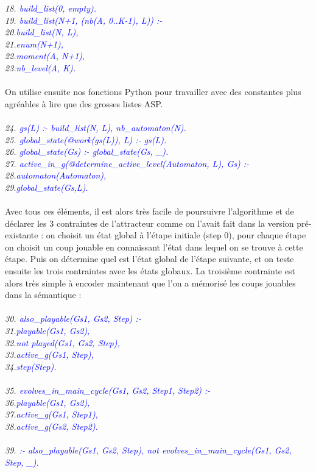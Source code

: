 \documentclass[10pt,a4paper]{article}
\begin{document}
\emph{
	18. \textcolor{blue}{build\_list(0, empty).}\\
	19. \textcolor{blue}{build\_list(N+1, (nb(A, 0..K-1), L)) :-}\\ 
	20.\qquad\textcolor{blue}{build\_list(N, L),}\\
	21.\qquad\textcolor{blue}{enum(N+1),}\\
	22.\qquad\textcolor{blue}{moment(A, N+1),}\\
	23.\qquad\textcolor{blue}{nb\_level(A, K).}\\ \\
}
On utilise ensuite nos fonctions Python pour travailler avec des constantes plus agréables à lire que des grosses listes ASP.\\ \\
\emph{
	24. \textcolor{blue}{gs(L) :- build\_list(N, L), nb\_automaton(N).}\\
	25. \textcolor{blue}{global\_state(@work(gs(L)), L) :- gs(L). }\\ 
	26. \textcolor{blue}{global\_state(Gs) :- global\_state(Gs, \_).}\\
	27. \textcolor{blue}{active\_in\_g(@determine\_active\_level(Automaton, L), Gs) :-}\\
	28.\qquad\textcolor{blue}{automaton(Automaton),}\\
	29.\qquad\textcolor{blue}{global\_state(Gs,L).}\\ \\
}
Avec tous ces éléments, il est alors très facile de poursuivre l'algorithme et de déclarer les 3 contraintes de l'attracteur comme on l'avait fait dans la version pré-existante : on choisit un état global à l'étape initiale 
(step 0), pour chaque étape on choisit un coup jouable en connaissant l'état dans lequel on se trouve à cette étape. Puis on détermine quel est l'état global de l'étape suivante, et on teste ensuite les trois contraintes avec les 
états globaux. La troisième contrainte est alors très simple à encoder maintenant que l'on a mémorisé les coups jouables dans la sémantique :\\ \\
\emph{
	30. \textcolor{blue}{also\_playable(Gs1, Gs2, Step) :-}\\
	31.\qquad\textcolor{blue}{playable(Gs1, Gs2),}\\
	32.\qquad\textcolor{blue}{not played(Gs1, Gs2, Step),}\\
	33.\qquad\textcolor{blue}{active\_g(Gs1, Step),}\\
	34.\qquad\textcolor{blue}{step(Step).}\\ \\
	35. \textcolor{blue}{evolves\_in\_main\_cycle(Gs1, Gs2, Step1, Step2) :-}\\
	36.\qquad\textcolor{blue}{playable(Gs1, Gs2),}\\
	37.\qquad\textcolor{blue}{active\_g(Gs1, Step1),}\\
	38.\qquad\textcolor{blue}{active\_g(Gs2, Step2).}\\ \\
	39. \textcolor{blue}{:- also\_playable(Gs1, Gs2, Step), not evolves\_in\_main\_cycle(Gs1, Gs2, Step, \_).}\\ \\
}
\end{document}
